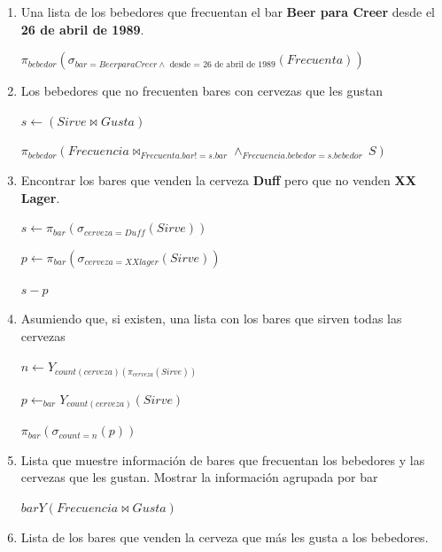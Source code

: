 \documentclass{article}
\begin{document}
\begin{enumerate}
    
    
    \begin{enumerate}
        \item Una lista de los bebedores que frecuentan el bar \textbf{Beer para Creer} desde el \textbf{26 de abril de 1989}. 
        
        $\pi_{bebedor}(\sigma_{bar= Beer para Creer \wedge \text{ desde = 26 de abril de 1989}}(Frecuenta))$
        
        \item Los bebedores que no frecuenten bares con cervezas que les gustan
        
        $s \leftarrow (Sirve \bowtie Gusta)$
        
        $\pi_{bebedor}(Frecuencia \bowtie_{Frecuenta.bar!=s.bar} \wedge_{Frecuencia.bebedor=s.bebedor}\  S)$
        
        \item Encontrar los bares que venden la cerveza \textbf{Duff} pero que no venden \textbf{XX Lager}.
        
        $s \leftarrow \pi_{bar}(\sigma_{cerveza=Duff}(Sirve))$
        
        $p \leftarrow \pi_{bar}(\sigma_{cerveza=XX lager}(Sirve))$
        
        $s-p$
        
        \item Asumiendo que, si existen, una lista con los bares que sirven todas las cervezas
        
        $n \leftarrow Y_{count(cerveza)(\pi_{cerveza}(Sirve))}$
        
        $p \leftarrow_{bar} Y_{count(cerveza)}(Sirve)$
        
        $\pi_{bar}(\sigma_{count=n}(p))$
        
        \item Lista que muestre información de bares que frecuentan los bebedores y las cervezas que les gustan. Mostrar la información agrupada por bar
        
        $barY(Frecuencia \bowtie Gusta)$
        
        \item Lista de los bares que venden la cerveza que más les gusta a los bebedores.
        

\end{enumerate}
\end{enumerate}
\end{document}
